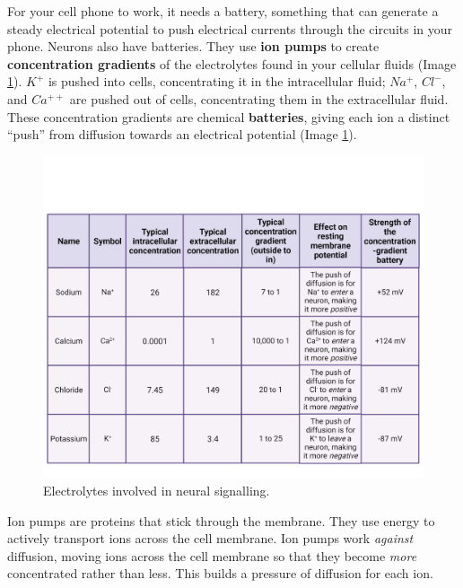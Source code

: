 \documentclass[
]{book}
\begin{document}
For your cell phone to work, it needs a battery, something that can generate a steady electrical potential to push electrical currents through the circuits in your phone. Neurons also have batteries. They use \textbf{ion pumps} to create \textbf{concentration gradients} of the electrolytes found in your cellular fluids (Image \ref{fig:electrolytes-table}). \(K^+\) is pushed into cells, concentrating it in the intracellular fluid; \(Na^+\), \(Cl^{-}\), and \(Ca^{++}\) are pushed out of cells, concentrating them in the extracellular fluid. These concentration gradients are chemical \textbf{batteries}, giving each ion a distinct ``push'' from diffusion towards an electrical potential (Image \ref{fig:electrolytes-table}).

\begin{figure}

{\centering \includegraphics[width=0.9\linewidth]{images/ch02/table_02_02} 

}

\caption{Electrolytes involved in neural signalling.}\label{fig:electrolytes-table}
\end{figure}

Ion pumps are proteins that stick through the membrane. They use energy to actively transport ions across the cell membrane. Ion pumps work \emph{against} diffusion, moving ions across the cell membrane so that they become \emph{more} concentrated rather than less. This builds a pressure of diffusion for each ion.
\end{document}
